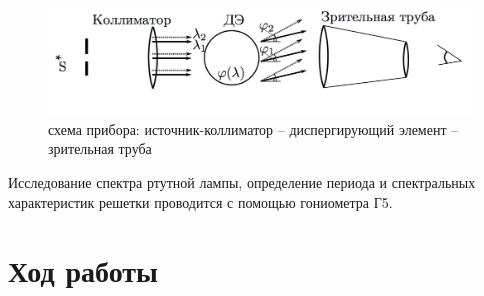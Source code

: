 \documentclass[a4paper,12pt]{article}
\begin{document}
\begin{figure}[h]
	\centering
	\includegraphics[scale = 0.4]{scheme}
	\caption{схема прибора: источник-коллиматор -- диспергирующий элемент -- зрительная труба}
	\label{fig:scheme}
\end{figure}

\noindent Исследование спектра ртутной лампы, определение периода и спектральных характеристик решетки проводится с помощью гониометра Г5.
\newpage

\section*{Ход работы}
\end{document}
